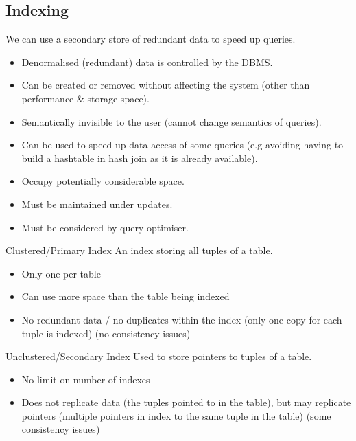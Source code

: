 \subsection{Indexing}
We can use a secondary store of redundant data to speed up queries.
\begin{itemize}
    \item Denormalised (redundant) data is controlled by the DBMS.
    \item Can be created or removed without affecting the system (other than performance \& storage space).
    \item Semantically invisible to the user (cannot change semantics of queries).
    \item Can be used to speed up data access of some queries (e.g avoiding having to build a hashtable in hash join as it is already available).
    \item Occupy potentially considerable space.
    \item Must be maintained under updates.
    \item Must be considered by query optimiser.
\end{itemize}
\begin{definitionbox}{Clustered/Primary Index}
    An index storing all tuples of a table.
    \begin{itemize}
        \item Only one per table
        \item Can use more space than the table being indexed
        \item No redundant data / no duplicates within the index (only one copy for each tuple is indexed) (no consistency issues)
    \end{itemize}
\end{definitionbox}
\begin{definitionbox}{Unclustered/Secondary Index}
    Used to store pointers to tuples of a table.
    \begin{itemize}
        \item No limit on number of indexes
        \item Does not replicate data (the tuples pointed to in the table), but may replicate pointers (multiple pointers in index to the same tuple in the table) (some consistency issues)
    \end{itemize}
\end{definitionbox}
